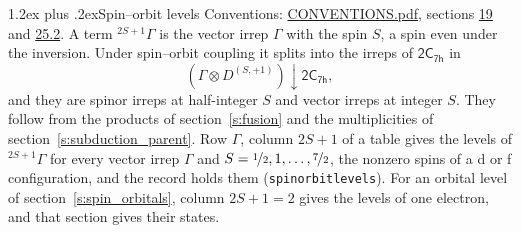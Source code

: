 \documentclass[10pt,a4paper]{article}
\makeatletter
\renewcommand\section{\@startsection{section}{1}{\z@}{-3ex plus -1ex minus -.2ex}%
  {1.2ex plus .2ex}{\normalfont\large\sffamily\bfseries\color{parttitle}}}
\numberwithin{equation}{section}
\newcommand{\grp}[1]{\mathsf{#1}}
\newcommand{\restr}[2]{#1\!\downarrow#2}
\newcommand{\irrJp}[2]{D^{(#1,#2)}}
\newcommand{\irrprod}{\otimes}
\newcommand{\term}[2]{{}^{#1}#2}
\makeatother
\begin{document}
\section{Spin--orbit levels}\label{s:spin_orbit}
Conventions: \href{../../CONVENTIONS.pdf}{CONVENTIONS.pdf}, sections \href{../../../rotation/CONVENTIONS.pdf\#conv.19}{19} and \href{../../CONVENTIONS.pdf\#conv.25.2}{25.2}.
\leavevmode\label{n:local.spin}\label{n:symbol.term}A term $\term{2S+1}{\Gamma}$ is the vector irrep $\Gamma$ with the spin $S$, a spin even under the inversion. Under spin--orbit coupling it splits into the irreps of $\grp{2C_{7h}}$ in
\begin{equation}\label{e:spinorbit}\restr{(\Gamma \irrprod \irrJp{S}{+1})}{\grp{2C_{7h}}},\end{equation}
and they are spinor irreps at half-integer $S$ and vector irreps at integer $S$. They follow from the products of section~\ref{s:fusion} and the multiplicities of section~\ref{s:subduction_parent}. Row $\Gamma$, column $2S + 1$ of a table gives the levels of $\term{2S+1}{\Gamma}$ for every vector irrep $\Gamma$ and $S = \nicefrac{1}{2}, 1, \dots, \nicefrac{7}{2}$, the nonzero spins of a d or f configuration, and the record holds them (\texttt{spinorbitlevels}). For an orbital level of section~\ref{s:spin_orbitals}, column $2S + 1 = 2$ gives the levels of one electron, and that section gives their states.
\end{document}
